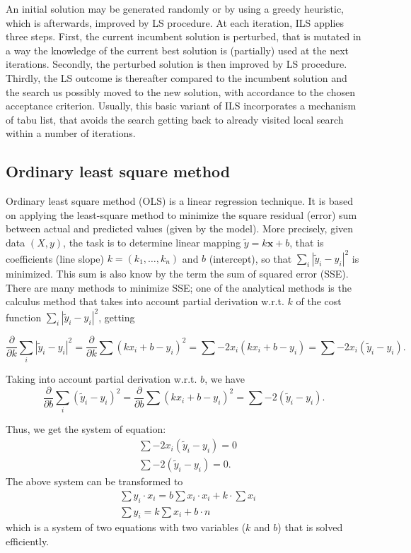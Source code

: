 \documentclass[a4paper,12pt]{elsarticle}
\begin{document}
An initial solution may be generated randomly or by using a greedy heuristic, which is afterwards, improved by LS procedure. At each iteration, ILS applies three steps. First, the current incumbent solution is perturbed, that is mutated in a way the knowledge of the current best solution is (partially) used at the next iterations.  Secondly, the perturbed solution is then improved by LS procedure. Thirdly, the LS outcome is thereafter compared to the incumbent solution and the search us possibly moved to the new solution, with accordance to the chosen acceptance criterion. Usually, this basic variant of ILS incorporates a mechanism of tabu list, that avoids the search getting back to already visited local search within a number of iterations. 
   
 \subsection{Ordinary least square method}
   Ordinary least square method (OLS) is a linear regression technique. It is based on applying the least-square method to minimize the square residual (error) sum  between actual and predicted values (given by the model). More precisely, given data $({X}, y)$, the task is to determine linear mapping $\tilde{y} = k \textbf{x} + b$, that is coefficients (line slope) $k = (k_1, \ldots, k_n)$ and $b$ (intercept), so that $ \sum_{i} |\tilde{y}_i - y_i|^2 $ is minimized. This sum is also know by the term the sum of squared error (SSE). There are many methods to minimize SSE; one of the analytical methods is the calculus method that takes into account   partial derivation w.r.t.  $k$ of the cost function $ \sum_{i} |\tilde{y}_i - y_i|^2 $, getting 
   
   $$  \frac{\partial}{\partial k} \sum_{i} |\tilde{y}_i - y_i|^2 = \frac{\partial}{\partial k} \sum ( kx_i+b  - y_i)^2 =  \sum -2x_i(kx_i + b - y_i)  =  \sum -2x_i (\tilde{y}_i - y_i ) . $$
   
   Taking into account   partial derivation w.r.t.  $b$, we have 
    $$  \frac{\partial}{\partial b} \sum_{i} (\tilde{y}_i - y_i)^2  = \frac{\partial}{\partial b} \sum ( kx_i+b  - y_i)^2 = \sum -2  (\tilde{y}_i - y_i). $$
    
    Thus, we get the system of equation: 
    \begin{align*}
    	  &\sum -2x_i (\tilde{y}_i - y_i )  = 0 \\
    	  &\sum -2  (\tilde{y}_i - y_i ) = 0.
    \end{align*}
     The above system can be transformed to 
     \begin{align*}
     	 & \sum y_i \cdot x_i   = b\sum x_i \cdot x_i  +  k \cdot \sum x_i \\
     	 & \sum y_i  = k \sum x_i + b \cdot n 
     \end{align*}
     which is a system of two equations with two variables ($k$ and $b$) that is  solved efficiently.
\end{document}
